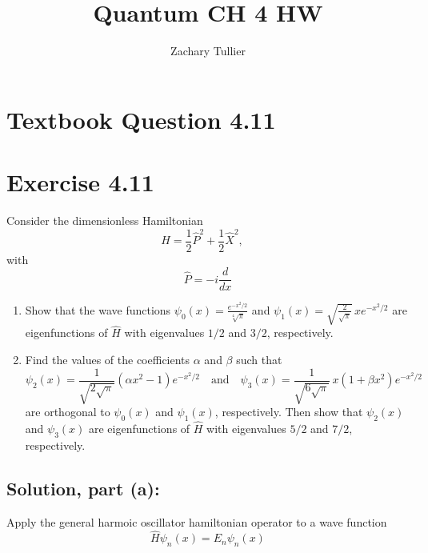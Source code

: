 \documentclass[12pt]{article}
\begin{document}
\singlespacing  %
\title{Quantum CH 4 HW}

\author[1]{Zachary Tullier}
\date{}
\maketitle

\section{Textbook Question 4.11}


\section*{Exercise 4.11}
    Consider the dimensionless Hamiltonian
    \[
        \hat{H} = \frac{1}{2} \hat{P}^2 + \frac{1}{2} \hat{X}^2, \quad
    \]
    with 
    \[
        \hat{P} = -i \frac{d}{dx}
    \]
    
    \begin{enumerate}
        \item[(a)] Show that the wave functions $\psi_0(x) = \frac{e^{-x^2/2}}{\sqrt[4]{\pi}}$ and $\psi_1(x) = \sqrt{\frac{2}{\sqrt{\pi}}} \, x e^{-x^2/2}$ are eigenfunctions of $\hat{H}$ with eigenvalues \( 1/2 \) and \( 3/2 \), respectively.
        \item[(b)] Find the values of the coefficients \( \alpha \) and \( \beta \) such that
        \[
            \psi_2(x) = \frac{1}{\sqrt{2 \sqrt{\pi}}} \left( \alpha x^2 - 1 \right) e^{-x^2/2}
            \quad \text{and} \quad
            \psi_3(x) = \frac{1}{\sqrt{6 \sqrt{\pi}}} \, x \left( 1 + \beta x^2 \right) e^{-x^2/2}
        \]
        are orthogonal to \( \psi_0(x) \) and \( \psi_1(x) \), respectively. Then show that \( \psi_2(x) \) and \( \psi_3(x) \) are eigenfunctions of \( \hat{H} \) with eigenvalues \( 5/2 \) and \( 7/2 \), respectively.
    \end{enumerate}

    \subsection{Solution, part (a):}
        Apply the general harmoic oscillator hamiltonian operator to a wave function
        \[
            \hat{H} \psi_n(x) = E_n \psi_n(x)
        \]
        
\end{document}
